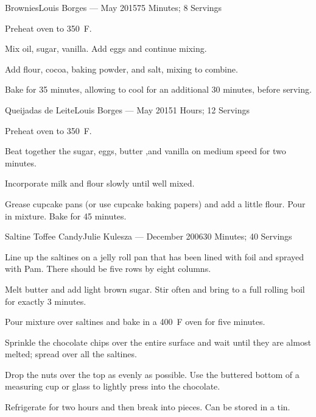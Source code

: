 \documentclass{article}
\begin{document}
\begin{recipe}{Brownies}{Louis Borges --- May 2015}{75 Minutes; 8 Servings}

   \newstep
   Preheat oven to 350\ \0F.

   Mix oil, sugar, vanilla.  Add eggs and continue mixing.

   Add flour, cocoa, baking powder, and salt, mixing to combine.

   \newstep
   Bake for 35 minutes, allowing to cool for an additional 30 minutes, before
   serving.

\end{recipe}

\begin{recipe}{Queijadas de Leite}{Louis Borges --- May 2015}{1 Hours; 12 Servings}

   \newstep
   Preheat oven to 350\ \0F.

   Beat together the sugar, eggs, butter ,and vanilla on medium speed for two
   minutes.

   Incorporate milk and flour slowly until well mixed.

   \newstep
   Grease cupcake pans (or use cupcake baking papers) and add a little flour.
   Pour in mixture.  Bake for 45 minutes.

\end{recipe}

\begin{recipe}{Saltine Toffee Candy}{Julie Kulesza --- December 2006}{30 Minutes; 40 Servings}

   Line up the saltines on a jelly roll pan that has been lined with foil and
   sprayed with Pam.  There should be five rows by eight columns.

   Melt butter and add light brown sugar.  Stir often and bring to a full
   rolling boil for exactly 3 minutes.

   \newstep
   Pour mixture over saltines and bake in a 400\ \0F oven for five minutes.

   Sprinkle the chocolate chips over the entire surface and wait until they are
   almost melted; spread over all the saltines.

   Drop the nuts over the top as evenly as possible. Use the buttered bottom of
   a measuring cup or glass to lightly press into the chocolate.

   \newstep
   Refrigerate for two hours and then break into pieces.  Can be stored in a
   tin.

\end{recipe}
\end{document}
